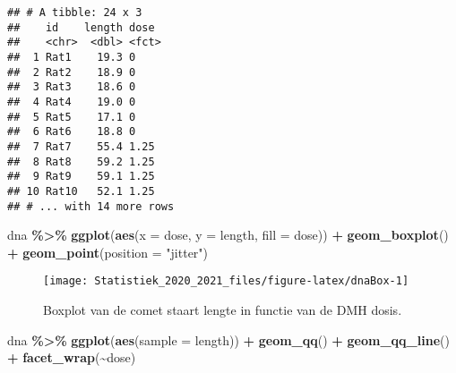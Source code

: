 \documentclass[
  12pt,dutch,coursenotes]{book}
\newenvironment{Shaded}{\begin{snugshade}}{\end{snugshade}}
\newcommand{\DataTypeTok}[1]{\textcolor[rgb]{0.13,0.29,0.53}{#1}}
\newcommand{\KeywordTok}[1]{\textcolor[rgb]{0.13,0.29,0.53}{\textbf{#1}}}
\newcommand{\NormalTok}[1]{#1}
\newcommand{\OperatorTok}[1]{\textcolor[rgb]{0.81,0.36,0.00}{\textbf{#1}}}
\newcommand{\StringTok}[1]{\textcolor[rgb]{0.31,0.60,0.02}{#1}}
\theoremstyle{definition}
\theoremstyle{definition}
\theoremstyle{definition}
\theoremstyle{remark}
\begin{document}
\begin{Shaded}
\end{Shaded}

\begin{verbatim}
## # A tibble: 24 x 3
##    id    length dose 
##    <chr>  <dbl> <fct>
##  1 Rat1    19.3 0    
##  2 Rat2    18.9 0    
##  3 Rat3    18.6 0    
##  4 Rat4    19.0 0    
##  5 Rat5    17.1 0    
##  6 Rat6    18.8 0    
##  7 Rat7    55.4 1.25 
##  8 Rat8    59.2 1.25 
##  9 Rat9    59.1 1.25 
## 10 Rat10   52.1 1.25 
## # ... with 14 more rows
\end{verbatim}

\begin{Shaded}
\begin{Highlighting}[]
\NormalTok{dna }\OperatorTok{\%\textgreater{}\%}\StringTok{ }\KeywordTok{ggplot}\NormalTok{(}\KeywordTok{aes}\NormalTok{(}\DataTypeTok{x =}\NormalTok{ dose, }\DataTypeTok{y =}\NormalTok{ length, }\DataTypeTok{fill =}\NormalTok{ dose)) }\OperatorTok{+}\StringTok{ }
\StringTok{    }\KeywordTok{geom\_boxplot}\NormalTok{() }\OperatorTok{+}\StringTok{ }\KeywordTok{geom\_point}\NormalTok{(}\DataTypeTok{position =} \StringTok{"jitter"}\NormalTok{)}
\end{Highlighting}
\end{Shaded}

\begin{figure}

{\centering \texttt{[image: Statistiek\_2020\_2021\_files/figure-latex/dnaBox-1]} 

}

\caption{Boxplot van de comet staart lengte in functie van de DMH dosis.}\label{fig:dnaBox}
\end{figure}

\begin{Shaded}
\begin{Highlighting}[]
\NormalTok{dna }\OperatorTok{\%\textgreater{}\%}\StringTok{ }\KeywordTok{ggplot}\NormalTok{(}\KeywordTok{aes}\NormalTok{(}\DataTypeTok{sample =}\NormalTok{ length)) }\OperatorTok{+}\StringTok{ }\KeywordTok{geom\_qq}\NormalTok{() }\OperatorTok{+}\StringTok{ }
\StringTok{    }\KeywordTok{geom\_qq\_line}\NormalTok{() }\OperatorTok{+}\StringTok{ }\KeywordTok{facet\_wrap}\NormalTok{(}\OperatorTok{\textasciitilde{}}\NormalTok{dose)}
\end{Highlighting}
\end{Shaded}
\end{document}
